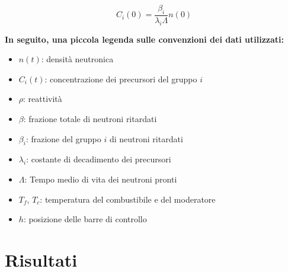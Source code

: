 \documentclass[12pt]{report}
\begin{document}
\begin{equation}
C_{i}(0) = \frac{\beta_i}{\lambda_i \Lambda} n(0)
\end{equation}

\textbf{In seguito, una piccola legenda sulle convenzioni dei dati utilizzati:}

\begin{itemize}
\item $n(t)$: densità neutronica
\item $C_i(t)$: concentrazione dei precursori del gruppo $i$
\item $\rho$: reattività
\item $\beta$: frazione totale di neutroni ritardati
\item $\beta_i$: frazione del gruppo $i$ di neutroni ritardati
\item $\lambda_i$: costante di decadimento dei precursori
\item $\Lambda$: Tempo medio di vita dei neutroni pronti
\item $T_f$, $T_c$: temperatura del combustibile e del moderatore
\item $h$: posizione delle barre di controllo
\end{itemize}

\section{Risultati}
\end{document}
